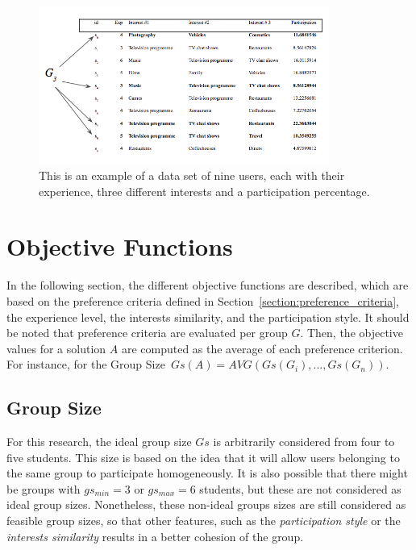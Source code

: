 \begin{figure}[!htp]
    \includegraphics[width=0.85\textwidth]{images/dataset_eg.png}
    \caption{This is an example of a data set of nine users, each with their experience, three different interests and a participation percentage.}
    \label{fig:dataset_eg}
\end{figure}

\section{Objective Functions} 
\label{section:objective_functions}

In the following section, the different objective functions are described, which are based on the preference criteria defined in Section~\ref{section:preference_criteria}, the experience level, the interests similarity, and the participation style. It should be noted that preference criteria are evaluated per group $G$. Then, the objective values for a solution $A$ are computed as the average of each preference criterion. For instance, for the Group Size~$Gs(A) = AVG(Gs(G_i),...,Gs(G_n))$.\\

\subsection{Group Size}
\label{subsection:group_size}

For this research, the ideal group size $Gs$ is arbitrarily considered from four to five students. This size is based on the idea that it will allow users belonging to the same group to participate homogeneously. It is also possible that there might be groups with $gs_{min} = 3$ or $gs_{max} = 6$ students, but these are not considered as ideal group sizes. Nonetheless, these non-ideal groups sizes are still considered as feasible group sizes, so that other features, such as the \textit{participation style} or the \textit{interests similarity} results in a better cohesion of the group.\\

